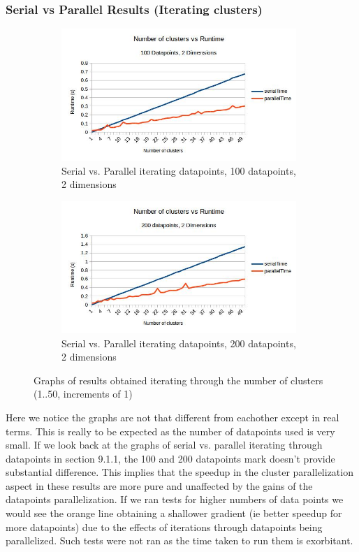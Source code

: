 \documentclass{article}
\begin{document}
\newpage
\subsubsection{Serial vs Parallel Results (Iterating clusters)}
\begin{figure}[h!]
    \begin{subfigure}{0.5\textwidth}
        \includegraphics[width=0.9\linewidth, height=5cm]{Pictures/clusters1.jpg}
        \caption{Serial vs. Parallel iterating datapoints, 100 datapoints, 2 dimensions}
    \end{subfigure}
    \begin{subfigure}{0.5\textwidth}
        \includegraphics[width=0.9\linewidth, height=5cm]{Pictures/clusters2.jpg}
        \caption{Serial vs. Parallel iterating datapoints, 200 datapoints, 2 dimensions}
    \end{subfigure}
\caption{Graphs of results obtained iterating through the number of clusters (1..50, increments of 1)}
\end{figure}

Here we notice the graphs are not that different from eachother except in real terms. This is really to be expected as the number of datapoints used is very small. If we look back at the graphs of serial vs. parallel iterating through datapoints in section 9.1.1, the 100 and 200 datapoints mark doesn't provide substantial difference. This implies that the speedup in the cluster parallelization aspect in these results are more pure and unaffected by the gains of the datapoints parallelization. If we ran tests for higher numbers of data points we would see the orange line obtaining a shallower gradient (ie better speedup for more datapoints) due to the effects of iterations through datapoints being parallelized. Such tests were not ran as the time taken to run them is exorbitant.
\end{document}
